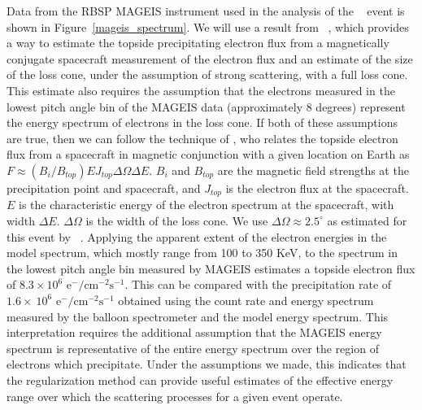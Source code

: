 Data from the RBSP MAGEIS instrument used in the analysis of the ~\cite{Halford2015} event is shown in Figure~\ref{mageis_spectrum}. We will use a result from ~\citet{kasahara2018}, which provides a way to estimate the topside precipitating electron flux from a magnetically conjugate spacecraft measurement of the electron flux and an estimate of the size of the loss cone,  under the assumption of strong scattering, with a full loss cone.  This estimate also requires the assumption that the electrons measured in the lowest pitch angle bin of the MAGEIS data (approximately 8 degrees) represent the energy spectrum of electrons in the loss cone. If both of these assumptions are true, then we can follow the technique of \cite{Kasahara2018}, who relates the topside electron flux from a spacecraft in magnetic conjunction with a given location on Earth as $F\approx (B_{i}/B_{top}) E J_{top} \Delta \Omega \Delta E$. $B_{i}$ and $B_{top}$ are the magnetic field strengths at the precipitation point and spacecraft, and $J_{top}$ is the electron flux at the spacecraft. $E$ is the characteristic energy of the electron spectrum at the spacecraft, with width $\Delta E$. $\Delta \Omega$ is the width of the loss cone. We use $\Delta \Omega \approx 2.5 ^{\circ}$ as estimated for this event by ~\cite{Halford2015}. Applying the apparent extent of the electron energies in the model spectrum, which mostly range from 100 to 350 KeV, to the spectrum in the lowest pitch angle bin measured by MAGEIS estimates a topside electron flux of $ 8.3\times 10^{6}\mbox{ e}^-/\mbox{cm}^{-2}\mbox{s}^{-1}$. This can be compared with the precipitation rate of $1.6\times\ 10^{6}\mbox{ e}^-/\mbox{cm}^{-2}\mbox{s}^{-1}$ obtained using the count rate and energy spectrum measured by the balloon spectrometer and the model energy spectrum. This interpretation requires the additional assumption that the MAGEIS energy spectrum is representative of the entire energy spectrum over the region of electrons which precipitate. Under the assumptions we made, this indicates that the regularization method can provide useful estimates of the effective energy range over which the scattering processes for a given event operate.

